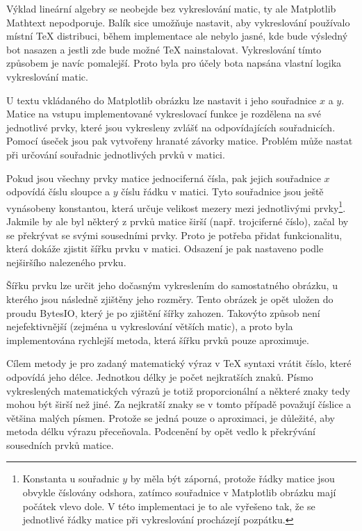 \documentclass[FM]{tulthesis}
\begin{document}
	Výklad lineární algebry se neobejde bez vykreslování matic, ty ale Matplotlib Mathtext nepodporuje. Balík sice umožňuje nastavit, aby vykreslování používalo místní TeX distribuci, během implementace ale nebylo jasné, kde bude výsledný bot nasazen a jestli zde bude možné TeX nainstalovat. Vykreslování tímto způsobem je navíc pomalejší. Proto byla pro účely bota napsána vlastní logika vykreslování matic.
	
	U textu vkládaného do Matplotlib obrázku lze nastavit i jeho souřadnice $x$ a $y$. Matice na vstupu implementované vykreslovací funkce je rozdělena na své jednotlivé prvky, které jsou vykresleny zvlášť na odpovídajících souřadnicích. Pomocí úseček jsou pak vytvořeny hranaté závorky matice. Problém může nastat při určování souřadnic jednotlivých prvků v matici.
	
	Pokud jsou všechny prvky matice jednociferná čísla, pak jejich souřadnice $x$ odpovídá číslu sloupce a $y$ číslu řádku v matici. Tyto souřadnice jsou ještě vynásobeny konstantou, která určuje velikost mezery mezi jednotlivými prvky\footnote{Konstanta u souřadnic $y$ by měla být záporná, protože řádky matice jsou obvykle číslovány odshora, zatímco souřadnice v Matplotlib obrázku mají počátek vlevo dole. V této implementaci je to ale vyřešeno tak, že se jednotlivé řádky matice při vykreslování procházejí pozpátku.}. Jakmile by ale byl některý z prvků matice širší (např. trojciferné číslo), začal by se překrývat se svými sousedními prvky. Proto je potřeba přidat funkcionalitu, která dokáže zjistit šířku prvku v matici. Odsazení je pak nastaveno podle nejširšího nalezeného prvku.
	
	Šířku prvku lze určit jeho dočasným vykreslením do samostatného obrázku, u kterého jsou následně zjištěny jeho rozměry. Tento obrázek je opět uložen do proudu BytesIO, který je po zjištění šířky zahozen. Takovýto způsob není nejefektivnější (zejména u vykreslování větších matic), a proto byla implementována rychlejší metoda, která šířku prvků pouze aproximuje.

	Cílem metody je pro zadaný matematický výraz v TeX syntaxi vrátit číslo, které odpovídá jeho délce. Jednotkou délky je počet nejkratších znaků. Písmo vykreslených matematických výrazů je totiž proporcionální a některé znaky tedy mohou být širší než jiné. Za nejkratší znaky se v tomto případě považují číslice a většina malých písmen. Protože se jedná pouze o aproximaci, je důležité, aby metoda délku výrazu přeceňovala. Podcenění by opět vedlo k překrývání sousedních prvků matice.
		
\end{document}
